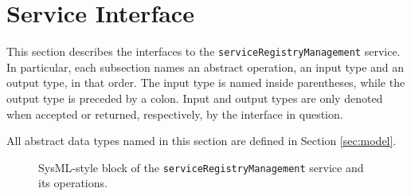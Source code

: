 \documentclass[a4paper]{arrowhead}
\begin{document}
\newpage

\section{Service Interface}
\label{sec:operations}

This section describes the interfaces to the \texttt{service\allowbreak{}Registry\allowbreak{}Management} service.
In particular, each subsection names an abstract operation, an input type and an output type, in that order.
The input type is named inside parentheses, while the output type is preceded by a colon.
Input and output types are only denoted when accepted or returned, respectively, by the interface in question.

All abstract data types named in this section are defined in Section \ref{sec:model}.

\begin{figure}[ht!]
  \centering
  \caption{SysML-style block of the \texttt{service\allowbreak{}Registry\allowbreak{}Management} service and its operations.}
  \label{fig:SD}
\end{figure}
\end{document}
